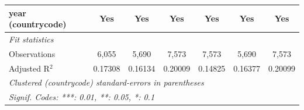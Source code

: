 \begin{tabular}{lcccccc}
   year (countrycode)                                                                              & Yes           & Yes                     & Yes             & Yes      & Yes                     & Yes\\  
   \midrule
   \emph{Fit statistics}\\
   Observations                                                                                    & 6,055         & 5,690                   & 7,573           & 7,573    & 5,690                   & 7,573\\  
   Adjusted R$^2$                                                                                  & 0.17308       & 0.16134                 & 0.20009         & 0.14825  & 0.16377                 & 0.20099\\  
   \midrule \midrule
   \multicolumn{7}{l}{\emph{Clustered (countrycode) standard-errors in parentheses}}\\
   \multicolumn{7}{l}{\emph{Signif. Codes: ***: 0.01, **: 0.05, *: 0.1}}\\
\end{tabular}
\par\endgroup



